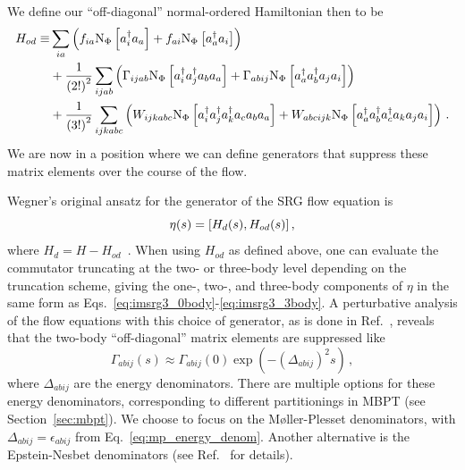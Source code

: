 We define our ``off-diagonal'' normal-ordered Hamiltonian then to be
\begin{equation}
  \begin{split}
    H_{od} \equiv & \sum_{ia}\left(f_{ia} \text{N}_{\Phi}\left[a_{i}^{\dagger}a_{a}\right]
                                + f_{ai} \text{N}_{\Phi}\left[a_{a}^{\dagger}a_{i}\right]\right) \\
                  & + \frac{1}{{(2!)}^2}\sum_{ijab} \left(
                      \Gamma_{ijab} \text{N}_{\Phi}\left[a_{i}^{\dagger}a_{j}^{\dagger}a_{b}a_{a}\right]
                      + \Gamma_{abij} \text{N}_{\Phi}\left[a_{a}^{\dagger}a_{b}^{\dagger}a_{j}a_{i}\right]
                    \right) \\
                  & + \frac{1}{{(3!)}^2}\sum_{ijkabc} \left(
                      W_{ijkabc} \text{N}_{\Phi}\left[a_{i}^{\dagger}a_{j}^{\dagger}a_{k}^{\dagger}a_{c}a_{b}a_{a}\right]
                      + W_{abcijk} \text{N}_{\Phi}\left[a_{a}^{\dagger}a_{b}^{\dagger}a_{c}^{\dagger}a_{k}a_{j}a_{i}\right]
                    \right)\,.
  \end{split}
\end{equation}
We are now in a position where we can define generators that suppress these matrix elements
over the course of the flow.

Wegner's original ansatz for the generator of the SRG flow equation is
\begin{equation}
  \eta(s) = [H_d(s), H_{od}(s)]\,,
\end{equation}
where $H_d = H - H_{od}$~\cite{Wegn94srg}.
When using $H_{od}$ as defined above,
one can evaluate the commutator truncating at the two- or three-body level
depending on the truncation scheme,
giving the one-, two-, and three-body components of $\eta$
in the same form as Eqs.~\ref{eq:imsrg3_0body}-\ref{eq:imsrg3_3body}.
A perturbative analysis of the flow equations with this choice of generator,
as is done in Ref.~\cite{Herg16imsrglecnotes},
reveals that the two-body ``off-diagonal'' matrix elements are suppressed like
\begin{equation}
  \Gamma_{abij}(s) \approx \Gamma_{abij}(0) \exp(-{(\Delta_{abij})}^{2} s)\,,
\end{equation}
where $\Delta_{abij}$ are the energy denominators.
There are multiple options for these energy denominators,
corresponding to different partitionings in MBPT (see Section~\ref{sec:mbpt}).
We choose to focus on the M{\o}ller-Plesset denominators,
with $\Delta_{abij} = \epsilon_{abij}$ from Eq.~\ref{eq:mp_energy_denom}.
Another alternative is the Epstein-Nesbet denominators
(see Ref.~\cite{Shav09mbpt_cc_book} for details).

